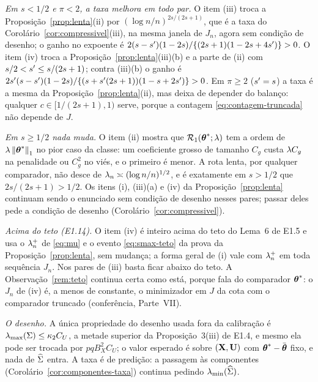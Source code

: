 \documentclass[11pt,a4paper]{article}
\newcommand{\lmin}{\lambda_{\min}}
\newcommand{\lmaxx}{\lambda_{\max}}
\newcommand{\thbar}{\bar{\btheta}}
\begin{document}
\begin{remark}\label{rem:truncada}
\emph{Em $s < 1/2$ e $\pi < 2$, a taxa melhora em todo par.} O item (iii)
troca a Proposição~\ref{prop:lenta}(ii) por $(\log n/n)^{2s/(2s+1)}$, que é a
taxa do Corolário~\ref{cor:compressivel}(iii), na mesma janela de $J_{n}$,
agora sem condição de desenho; o ganho no expoente é
$2(s-s')(1-2s)/\{(2s+1)(1-2s+4s')\} > 0$. O item (iv) troca a
Proposição~\ref{prop:lenta}(iii)(b) e a parte de (ii) com
$s/2 < s' \le s/(2s+1)$; contra (iii)(b) o ganho é
$2s'(s-s')(1-2s)/\{(s+s'(2s+1))(1-s+2s')\} > 0$. Em
$\pi \ge 2$ ($s' = s$) a taxa é a mesma da
Proposição~\ref{prop:lenta}(ii), mas deixa de depender do balanço: qualquer
$c \in [1/(2s+1), 1)$ serve, porque a contagem
\eqref{eq:contagem-truncada} não depende de $J$.

\emph{Em $s \ge 1/2$ nada muda.} O item (ii) mostra que
$\mathcal{R}_{1}(\boldsymbol{\theta}^{*};\lambda)$ tem a ordem de
$\lambda\left\lVert \boldsymbol{\theta}^{*} \right\rVert_{1}$ no pior caso da classe: um coeficiente grosso de
tamanho $C_{g}$ custa $\lambda C_{g}$ na penalidade ou $C_{g}^{2}$ no viés, e o
primeiro é menor. A rota lenta, por qualquer comparador, não desce de
$\lambda_{n} \asymp (\log n/n)^{1/2}$, e é exatamente em $s > 1/2$ que
$2s/(2s+1) > 1/2$. Os itens (i), (iii)(a) e (iv) da
Proposição~\ref{prop:lenta} continuam sendo o enunciado sem condição de
desenho nesses pares; passar deles pede a condição de desenho
(Corolário~\ref{cor:compressivel}).

\emph{Acima do teto (E1.14).} O item (iv) é inteiro acima do teto do Lema~6
de E1.5 e usa o $\lambda_{n}^{+}$ de \eqref{eq:mu} e o evento
\eqref{eq:smax-teto} da prova da Proposição~\ref{prop:lenta}, sem mudança; a
forma geral de (i) vale com $\lambda_{n}^{+}$ em toda sequência $J_{n}$. Nos
pares de (iii) basta ficar abaixo do teto. A Observação~\ref{rem:teto}
continua certa como está, porque fala do comparador $\boldsymbol{\theta}^{*}$: o $J_{n}$ de
(iv) é, a menos de constante, o minimizador em $J$ da cota com o comparador
truncado (conferência, Parte~VII).

\emph{O desenho.} A única propriedade do desenho usada fora da calibração é
$\lmaxx(\Gram) \le \kappa_{2}C_{U}$, a metade superior da Proposição~3(iii)
de E1.4, e mesmo ela pode ser trocada por $pqB_{X}^{2}C_{U}$; o valor
esperado é sobre $(\mathbf{X},\mathbf{U})$ com $\thetastar - \thbar$ fixo, e nada de
$\widehat{\Sigma}$ entra. A taxa é de predição: a passagem às componentes
(Corolário~\ref{cor:componentes-taxa}) continua pedindo $\lmin(\Gramhat)$.
\end{remark}
\end{document}
